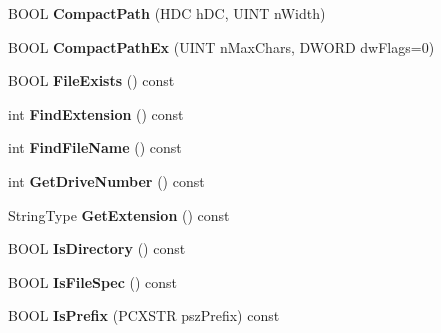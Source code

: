 \begin{DoxyCompactItemize}
\item 
\mbox{\label{class_a_t_l_1_1_c_path_t_a2347491172ef9671b5a661dd71b913ff}} 
B\+O\+OL {\bfseries Compact\+Path} (H\+DC h\+DC, U\+I\+NT n\+Width)
\item 
\mbox{\label{class_a_t_l_1_1_c_path_t_a762735d19930fb81b8a11bff783778d6}} 
B\+O\+OL {\bfseries Compact\+Path\+Ex} (U\+I\+NT n\+Max\+Chars, D\+W\+O\+RD dw\+Flags=0)
\item 
\mbox{\label{class_a_t_l_1_1_c_path_t_a53cd848a6f94fe4655d2bff6e58303d0}} 
B\+O\+OL {\bfseries File\+Exists} () const
\item 
\mbox{\label{class_a_t_l_1_1_c_path_t_acdb68cbeecc4848316c1d924ad519aeb}} 
int {\bfseries Find\+Extension} () const
\item 
\mbox{\label{class_a_t_l_1_1_c_path_t_a34259b8b794162324ed4cb3f9a48972d}} 
int {\bfseries Find\+File\+Name} () const
\item 
\mbox{\label{class_a_t_l_1_1_c_path_t_a16bff282b0a8a13d252ec77d7b1ce9f4}} 
int {\bfseries Get\+Drive\+Number} () const
\item 
\mbox{\label{class_a_t_l_1_1_c_path_t_a0520d7354de4b174e9a4e72f7873970a}} 
String\+Type {\bfseries Get\+Extension} () const
\item 
\mbox{\label{class_a_t_l_1_1_c_path_t_ac89a091c330bfd717329a76b72db3cbe}} 
B\+O\+OL {\bfseries Is\+Directory} () const
\item 
\mbox{\label{class_a_t_l_1_1_c_path_t_a8dacf7b787cebd07cdfd47958429af4b}} 
B\+O\+OL {\bfseries Is\+File\+Spec} () const
\item 
\mbox{\label{class_a_t_l_1_1_c_path_t_ac1a3ffa77ac395db72f2db323bd30877}} 
B\+O\+OL {\bfseries Is\+Prefix} (P\+C\+X\+S\+TR psz\+Prefix) const
\item 
\mbox{\label{class_a_t_l_1_1_c_path_t_a053aaa8ddbd6ea1b4f52c697271077ea}} 

\end{DoxyCompactItemize}

